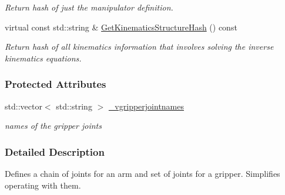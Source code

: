 \begin{DoxyCompactItemize}
\begin{DoxyCompactList}\small\item\em Return hash of just the manipulator definition. \item\end{DoxyCompactList}\item 
virtual const std::string \& \hyperlink{classOpenRAVE_1_1RobotBase_1_1Manipulator_a7322a77b768ce7997022a7b4b4ca46fe}{GetKinematicsStructureHash} () const 
\begin{DoxyCompactList}\small\item\em Return hash of all kinematics information that involves solving the inverse kinematics equations. \item\end{DoxyCompactList}\end{DoxyCompactItemize}
\subsubsection*{Protected Attributes}
\begin{DoxyCompactItemize}
\item 
\hypertarget{classOpenRAVE_1_1RobotBase_1_1Manipulator_a06e8b45efe1699af0520ca886402f495}{
std::vector$<$ std::string $>$ \hyperlink{classOpenRAVE_1_1RobotBase_1_1Manipulator_a06e8b45efe1699af0520ca886402f495}{\_\-vgripperjointnames}}
\label{classOpenRAVE_1_1RobotBase_1_1Manipulator_a06e8b45efe1699af0520ca886402f495}

\begin{DoxyCompactList}\small\item\em names of the gripper joints \item\end{DoxyCompactList}\end{DoxyCompactItemize}


\subsubsection{Detailed Description}
Defines a chain of joints for an arm and set of joints for a gripper. Simplifies operating with them. 

